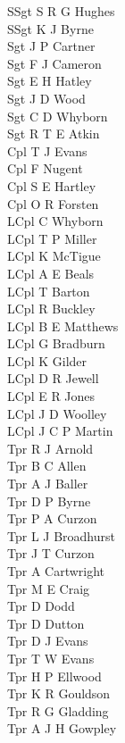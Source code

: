 \begin{multicols}{3}
  \small
  \noindent
  SSgt S R G Hughes \\
  SSgt K J Byrne \\
  Sgt J P Cartner \\
  Sgt F J Cameron \\
  Sgt E H Hatley \\
  Sgt J D Wood \\
  Sgt C D Whyborn \\
  Sgt R T E Atkin \\
  Cpl T J Evans \\
  Cpl F Nugent \\
  Cpl S E Hartley \\
  Cpl O R Forsten \\
  LCpl C Whyborn \\
  LCpl T P Miller \\
  LCpl K McTigue \\
  LCpl A E Beals \\
  LCpl T Barton \\
  LCpl R Buckley \\
  LCpl B E Matthews \\
  LCpl G Bradburn \\
  LCpl K Gilder \\
  LCpl D R Jewell \\
  LCpl E R Jones \\
  LCpl J D Woolley \\
  LCpl J C P Martin \\
  Tpr R J Arnold \\
  Tpr B C Allen \\
  Tpr A J Baller \\
  Tpr D P Byrne \\
  Tpr P A Curzon \\
  Tpr L J Broadhurst \\
  Tpr J T Curzon \\
  Tpr A Cartwright \\
  Tpr M E Craig \\
  Tpr D Dodd \\
  Tpr D Dutton \\
  Tpr D J Evans \\
  Tpr T W Evans \\
  Tpr H P Ellwood \\
  Tpr K R Gouldson \\
  Tpr R G Gladding \\
  Tpr A J H Gowpley \\

\end{multicols}
